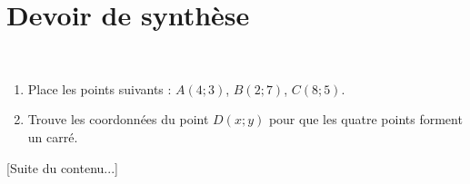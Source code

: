 \documentclass[10pt,openany]{book}
\begin{document}
\pagestyle{empty}
\section*{Devoir de synth\`ese}

\\
\begin{enumerate}
\item Place les points suivants : $A(4;3)$, $B(2;7)$, $C(8;5)$.
\item Trouve les coordonn\'ees du point $D(x;y)$ pour que les quatre points forment un carr\'e.
\end{enumerate}

[Suite du contenu...]
\end{document}
